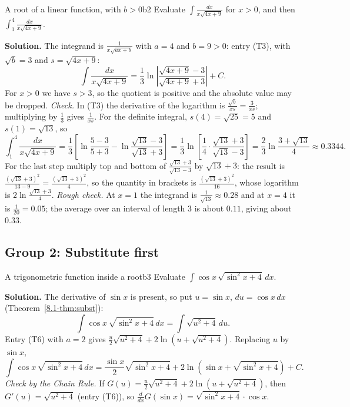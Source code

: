\documentclass[11pt]{article}
\begin{document}
\begin{exmp}{A root of a linear function, with $b>0$}{b2}
Evaluate $\displaystyle\int\frac{dx}{x\sqrt{4x+9}}$ for $x>0$, and then $\displaystyle\int_1^4\frac{dx}{x\sqrt{4x+9}}$.

\textbf{Solution.} The integrand is $\frac1{x\sqrt{ax+b}}$ with $a=4$ and $b=9>0$: entry (T3), with $\sqrt b=3$ and $s=\sqrt{4x+9}$:
\[\int\frac{dx}{x\sqrt{4x+9}}=\frac13\ln\left\lvert\frac{\sqrt{4x+9}-3}{\sqrt{4x+9}+3}\right\rvert+C .\]
For $x>0$ we have $s>3$, so the quotient is positive and the absolute value may be dropped.
\emph{Check.} In (T3) the derivative of the logarithm is $\frac{\sqrt b}{xs}=\frac3{xs}$; multiplying by $\frac13$ gives $\frac1{xs}$. For the definite integral, $s(4)=\sqrt{25}=5$ and $s(1)=\sqrt{13}$, so
\[\int_1^4\frac{dx}{x\sqrt{4x+9}}=\frac13\left[\ln\frac{5-3}{5+3}-\ln\frac{\sqrt{13}-3}{\sqrt{13}+3}\right]=\frac13\ln\left[\frac14\cdot\frac{\sqrt{13}+3}{\sqrt{13}-3}\right]=\frac23\ln\frac{3+\sqrt{13}}4\approx0.3344 .\]
For the last step multiply top and bottom of $\frac{\sqrt{13}+3}{\sqrt{13}-3}$ by $\sqrt{13}+3$: the result is $\frac{(\sqrt{13}+3)^2}{13-9}=\frac{(\sqrt{13}+3)^2}4$, so the quantity in brackets is $\frac{(\sqrt{13}+3)^2}{16}$, whose logarithm is $2\ln\frac{\sqrt{13}+3}4$.
\emph{Rough check.} At $x=1$ the integrand is $\frac1{\sqrt{13}}\approx0.28$ and at $x=4$ it is $\frac1{20}=0.05$; the average over an interval of length $3$ is about $0.11$, giving about $0.33$.
\end{exmp}

\subsection*{Group 2: Substitute first}

\begin{exmp}{A trigonometric function inside a root}{b3}
Evaluate $\displaystyle\int\cos x\,\sqrt{\sin^2x+4}\,dx$.

\textbf{Solution.} The derivative of $\sin x$ is present, so put $u=\sin x$, $du=\cos x\,dx$ (Theorem~\ref{8.1-thm:subst}):
\[\int\cos x\,\sqrt{\sin^2x+4}\,dx=\int\sqrt{u^2+4}\,du .\]
Entry (T6) with $a=2$ gives $\frac u2\sqrt{u^2+4}+2\ln\left(u+\sqrt{u^2+4}\right)$. Replacing $u$ by $\sin x$,
\[\int\cos x\,\sqrt{\sin^2x+4}\,dx=\frac{\sin x}2\sqrt{\sin^2x+4}+2\ln\left(\sin x+\sqrt{\sin^2x+4}\right)+C .\]
\emph{Check by the Chain Rule.} If $G(u)=\frac u2\sqrt{u^2+4}+2\ln\left(u+\sqrt{u^2+4}\right)$, then $G'(u)=\sqrt{u^2+4}$ (entry (T6)), so $\frac d{dx}G(\sin x)=\sqrt{\sin^2x+4}\cdot\cos x$.
\end{exmp}
\end{document}
